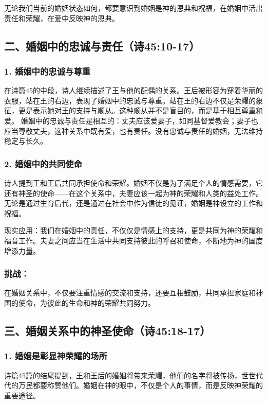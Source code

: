 \documentclass[a4paper, 12pt]{article}
\begin{document}
无论我们当前的婚姻状态如何，都要意识到婚姻是神的恩典和祝福，在婚姻中活出责任和荣耀，在爱中反映神的恩典。
\subsection*{二、婚姻中的忠诚与责任（诗45:10-17）}

\subsubsection*{1. 婚姻中的忠诚与尊重}
\hspace{0.6cm}在诗篇45的中段，诗人继续描述了王与他的配偶的关系。王后被形容为穿着华丽的衣服，站在王的右边，表现了婚姻中的忠诚与尊重。站在王的右边不仅是荣耀的象征，更是表示她对王的支持与顺从。这种顺从并不是盲目的，而是基于相互尊重和爱。
婚姻中的忠诚与责任是相互的：丈夫应该爱妻子，如同基督爱教会；妻子也应当尊敬丈夫，这种关系中既有爱，也有责任。没有忠诚与责任的婚姻，无法维持稳定与长久。
\subsubsection*{2. 婚姻中的共同使命}
\hspace{0.6cm}诗人提到王和王后共同承担使命和荣耀。婚姻不仅是为了满足个人的情感需要，它还有神圣的使命——在这个关系中，夫妻应该一起为神的荣耀和人类的益处工作。无论是通过生育后代，还是通过在社会中作为信徒的见证，婚姻是神设立的工作和祝福。

现实应用：我们在婚姻中的责任，不仅仅是情感上的支持，更是共同为神的荣耀和福音工作。夫妻之间应当在生活中共同支持彼此的呼召和使命，不断地为神的国度增添力量。
\subsubsection*{挑战：}

在婚姻关系中，不仅要注重情感的交流和支持，还要互相鼓励，共同承担家庭和神国的使命，为彼此的生命和神的荣耀共同努力。
\subsection*{三、婚姻关系中的神圣使命（诗45:18-17）}

\subsubsection*{1. 婚姻是彰显神荣耀的场所}
\hspace{0.6cm}诗篇45篇的结尾提到，王和王后的婚姻将带来荣耀，他们的名字将被传扬，世世代代的万民都要称赞他们。婚姻在神的眼中，不仅是个人的事情，而是反映神荣耀的重要途径。
\end{document}
